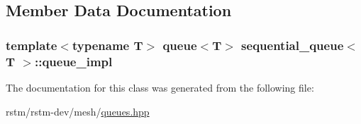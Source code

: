 \subsection{Member Data Documentation}
\hypertarget{classsequential__queue_aafb781a1557e6a8e47c895c46961e0d5}{
\subsubsection[{queue\-\_\-impl}]{\setlength{\rightskip}{0pt plus 5cm}template$<$typename T$>$ {\bf queue}$<$T$>$ {\bf sequential\-\_\-queue}$<$ T $>$\-::queue\-\_\-impl\hspace{0.3cm}{\ttfamily [private]}}}\label{classsequential__queue_aafb781a1557e6a8e47c895c46961e0d5}


The documentation for this class was generated from the following file\-:\begin{DoxyCompactItemize}
\item 
rstm/rstm-\/dev/mesh/\hyperlink{queues_8hpp}{queues.\-hpp}\end{DoxyCompactItemize}
